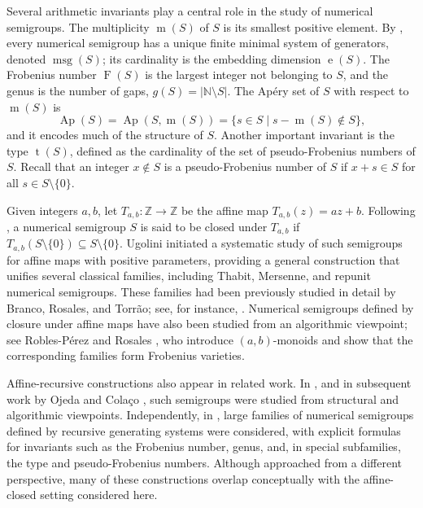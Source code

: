 \documentclass[12pt,a4paper]{amsart}
\theoremstyle{definition}
\begin{document}
Several arithmetic invariants play a central role in the study of numerical semigroups. The multiplicity $\operatorname{m}(S)$ of $S$ is its smallest positive element. By \cite[Theorem~2.7]{libro}, every numerical semigroup has a unique finite minimal system of generators, denoted $\operatorname{msg}(S)$; its cardinality is the embedding dimension $\operatorname{e}(S)$. The Frobenius number $\operatorname{F}(S)$ is the largest integer not belonging to $S$, and the genus is the number of gaps, $g(S)=|\mathbb{N}\setminus S|$. The Ap\'ery set of $S$ with respect to $\operatorname{m}(S)$ is
\[
\operatorname{Ap}(S)=\operatorname{Ap}(S,\operatorname{m}(S))=\{s\in S\mid s-\operatorname{m}(S)\notin S\},
\]
and it encodes much of the structure of $S$. Another important invariant is the type $\operatorname{t}(S)$, defined as the cardinality of the set of pseudo-Frobenius numbers of $S$. Recall that an integer $x\notin S$ is a pseudo-Frobenius number of $S$ if $x+s\in S$ for all $s\in S\setminus\{0\}$.

Given integers $a,b$, let $T_{a,b}:\mathbb Z\to\mathbb Z$ be the affine map $T_{a,b}(z)=az+b$. Following \cite{Ugo17}, a numerical semigroup $S$ is said to be closed under $T_{a,b}$ if $T_{a,b}(S\setminus\{0\})\subseteq S\setminus\{0\}$. Ugolini initiated a systematic study of such semigroups for affine maps with positive parameters, providing a general construction that unifies several classical families, including Thabit, Mersenne, and repunit numerical semigroups. These families had been previously studied in detail by Branco, Rosales, and Torr\~ao; see, for instance, \cite{RosBraTorThabit,RosBraTorMersenne,RosBraTorRepunit}. Numerical semigroups defined by closure under affine maps have also been studied from an algorithmic viewpoint; see Robles-P\'erez and Rosales \cite{RoblesRosales18}, who introduce $(a,b)$-monoids and show that the corresponding families form Frobenius varieties.

Affine-recursive constructions also appear in related work. In \cite{BrancoColacoOjeda23,BrancoColacoOjeda21}, and in subsequent work by Ojeda and Cola\c{c}o \cite{ColacoOjeda25}, such semigroups were studied from structural and algorithmic viewpoints. Independently, in \cite{XIN}, large families of numerical semigroups defined by recursive generating systems were considered, with explicit formulas for invariants such as the Frobenius number, genus, and, in special subfamilies, the type and pseudo-Frobenius numbers. Although approached from a different perspective, many of these constructions overlap conceptually with the affine-closed setting considered here.
\end{document}

